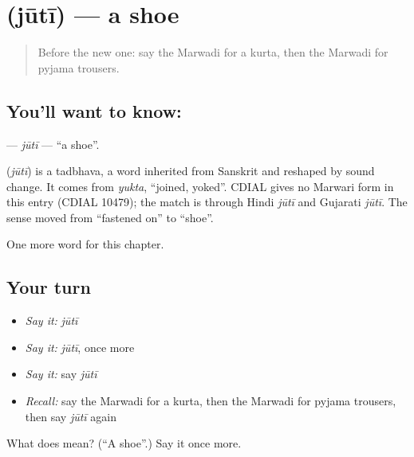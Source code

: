 \section[\texorpdfstring{\mw{जूती} (jūtī)}{जूती (jūtī)}]{ (jūtī) — a shoe}

\label{lesson:MW-C84-juti}



\begin{quote}
Before the new one: say the Marwadi for a kurta, then the Marwadi for pyjama trousers.
\end{quote}

\subsection*{You'll want to know: }
\textbf{} — \emph{jūtī} — \textquotedblleft{}a shoe\textquotedblright{}.

\begin{cousinweb}
\textbf{} (\emph{jūtī}) is a tadbhava, a word inherited from Sanskrit and reshaped by sound change. It comes from \emph{yukta}, \textquotedblleft{}joined, yoked\textquotedblright{}. CDIAL gives no Marwari form in this entry (CDIAL 10479); the match is through Hindi \emph{jūtī} and Gujarati \emph{jūtī}. The sense moved from \textquotedblleft{}fastened on\textquotedblright{} to \textquotedblleft{}shoe\textquotedblright{}.
\end{cousinweb}

\begin{grammarlens}[title={What you've built}]
One more word for this chapter.
\end{grammarlens}

\subsection*{Your turn}
\begin{itemize}
\raggedright
  \item \emph{Say it:} \emph{jūtī}
  \item \emph{Say it:} \emph{jūtī}, once more
  \item \emph{Say it:} say \emph{jūtī}
  \item \emph{Recall:} say the Marwadi for a kurta, then the Marwadi for pyjama trousers, then say \emph{jūtī} again
\end{itemize}

\begin{tcolorbox}[breakable,colback=teal!4,colframe=teal!35!black,title={Before you move on}]
What does  mean? (\textquotedblleft{}A shoe\textquotedblright{}.) Say it once more.
\end{tcolorbox}
